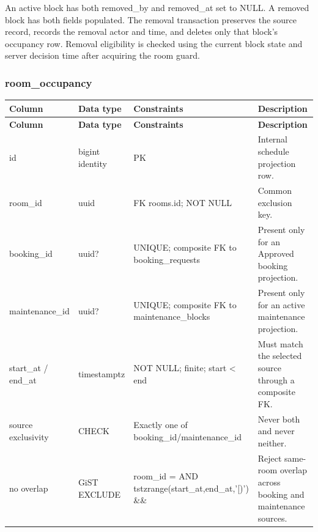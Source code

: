 \vspace{2mm}

An active block has both removed\allowbreak\_\allowbreak{}by and removed\allowbreak\_\allowbreak{}at set to NULL. A removed block has both fields populated. The removal transaction preserves the source record, records the removal actor and time, and deletes only that block's occupancy row. Removal eligibility is checked using the current block state and server decision time after acquiring the room guard.\par

\subsubsection{room\allowbreak\_\allowbreak{}occupancy}

\begin{longtable}{|p{}|p{}|p{}|p{}|}

\hline

\textbf{Column} & \textbf{Data type} & \textbf{Constraints} & \textbf{Description} \\ \hline

\endfirsthead

\hline

\textbf{Column} & \textbf{Data type} & \textbf{Constraints} & \textbf{Description} \\ \hline

\endhead

id & bigint identity & PK & Internal schedule projection row. \\ \hline

room\allowbreak\_\allowbreak{}id & uuid & FK rooms.id; NOT NULL & Common exclusion key. \\ \hline

booking\allowbreak\_\allowbreak{}id & uuid? & UNIQUE; composite FK to booking\allowbreak\_\allowbreak{}requests & Present only for an Approved booking projection. \\ \hline

maintenance\allowbreak\_\allowbreak{}id & uuid? & UNIQUE; composite FK to maintenance\allowbreak\_\allowbreak{}blocks & Present only for an active maintenance projection. \\ \hline

start\allowbreak\_\allowbreak{}at /\allowbreak{} end\allowbreak\_\allowbreak{}at & timestamptz & NOT NULL; finite; start < end & Must match the selected source through a composite FK. \\ \hline

source exclusivity & CHECK & Exactly one of booking\allowbreak\_\allowbreak{}id/\allowbreak{}maintenance\allowbreak\_\allowbreak{}id & Never both and never neither. \\ \hline

no overlap & GiST EXCLUDE & room\allowbreak\_\allowbreak{}id = AND tstzrange(start\allowbreak\_\allowbreak{}at,end\allowbreak\_\allowbreak{}at,'[)') \&\& & Reject same-room overlap across booking and maintenance sources. \\ \hline

\end{longtable}

